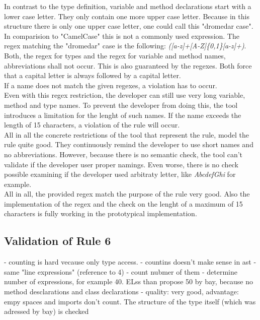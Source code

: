 In contrast to the type definition, variable and method declarations start with a lower case letter. They only contain one more upper case letter. Because in this structure there is only one upper case letter, one could call this "dromedar case". In comparision to "CamelCase" this is not a commonly used expression. The regex matching the "dromedar" case is the following: \textit{([a-z]+[A-Z]\{0,1\}[a-z]+)}.
\\

Both, the regex for types and the regex for variable and method names, abbreviations shall not occur. This is also guaranteed by the regexes. Both force that a capital letter is always followed by a capital letter.
\\

If a name does not match the given regexes, a violation has to occur.
\\

Even with this regex restriction, the developer can still use very long variable, method and type names. To prevent the developer from doing this, the tool introduces a limitation for the lenght of such names. If the name exceeds the length of 15 characters, a violation of the rule will occur.
\\

All in all the concrete restrictions of the tool that represent the rule, model the rule quite good. They continuously remind the developer to use short names and no abbreviations. However, because there is no semantic check, the tool can't validate if the developer user proper namings. Even worse, there is no check possible examining if the developer used arbitraty letter, like \textit{AbcdefGhi} for example.
\\

All in all, the provided regex match the purpose of the rule very good. Also the implementation of the regex and the check on the lenght of a maximum of 15 characters is fully working in the prototypical implementation.


\subsection*{Validation of Rule 6}
 - counting is hard vecause only type access. 
 - countins doesn't make sense in ast
- same "line expressions" (reference to 4)
 - count nubmer of them
  - determine number of expressions, for example 40. ELss than propose 50 by bay, because no method desclarations and class declarations
 - quality: very good, advantage: empy spaces and imports don't count. The structure of the type itself (which was adressed by bay) is checked

